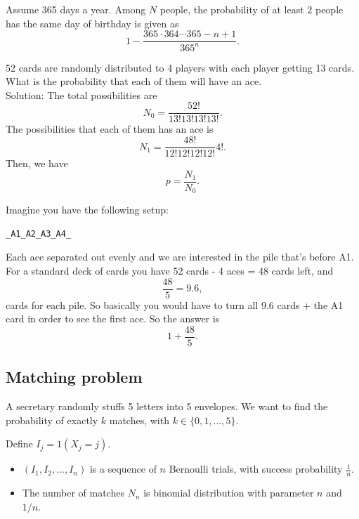 \begin{refsection}
\begin{example}
	Assume 365 days a year. Among $N$ people, the probability of at least $2$ people has the same day of birthday is given as
	$$1 - \frac{365\cdot 364 \cdots 365-n+1}{365^n}.$$
\end{example}


\begin{example}
52 cards are randomly distributed to 4 players with each player getting 13 cards. What is the probability that each of them will have an ace. \\
Solution:
The total possibilities are
$$N_0 = \frac{52!}{13!13!13!13!}.$$
The possibilities that each of them has an ace is
$$N_1=\frac{48!}{12!12!12!12!}4!.$$
Then, we have
$$p = \frac{N_1}{N_0}.$$
\end{example}


\begin{example}
Imagine you have the following setup: 
\begin{verbatim}
_A1_A2_A3_A4_
\end{verbatim}
Each ace separated out evenly and we are interested in the pile that's before A1. For a standard deck of cards you have 52 cards - 4 aces = 48 cards left, and
$$\frac{48}{5} = 9.6,$$
cards for each pile. So basically you would have to turn all 9.6 cards + the A1 card in order to see the first ace. So the answer is
$$1 + \frac{48}{5}.$$
\end{example}


\subsection{Matching problem}


\begin{example}
A secretary randomly stuffs 5 letters into 5 envelopes. We want to find the probability of exactly $k$ matches, with $k\in \{0,1,...,5\}$.	
\end{example}



\begin{lemma}
Define $I_j = 1(X_j=j)$. 
\begin{itemize}
	\item $(I_1,I_2,...,I_n)$ is a sequence of $n$ Bernoulli trials, with success probability $\frac{1}{n}$.
	\item The number of matches $N_n$ is binomial distribution with parameter $n$ and $1/n$.
\end{itemize}
\end{lemma}



\end{refsection}
